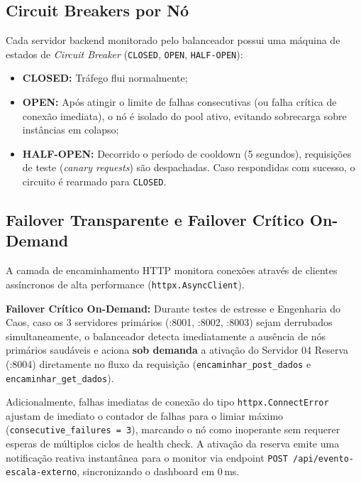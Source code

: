 \documentclass[12pt,a4paper]{article}
\begin{document}
\subsection{Circuit Breakers por Nó}
Cada servidor backend monitorado pelo balanceador possui uma máquina de estados de \textit{Circuit Breaker} (\texttt{CLOSED}, \texttt{OPEN}, \texttt{HALF-OPEN}):
\begin{itemize}
	\item \textbf{CLOSED:} Tráfego flui normalmente;
	\item \textbf{OPEN:} Após atingir o limite de falhas consecutivas (ou falha crítica de conexão imediata), o nó é isolado do pool ativo, evitando sobrecarga sobre instâncias em colapso;
	\item \textbf{HALF-OPEN:} Decorrido o período de cooldown (5 segundos), requisições de teste (\textit{canary requests}) são despachadas. Caso respondidas com sucesso, o circuito é rearmado para \texttt{CLOSED}.
\end{itemize}

\subsection{Failover Transparente e Failover Crítico On-Demand}
A camada de encaminhamento HTTP monitora conexões através de clientes assíncronos de alta performance (\texttt{httpx.AsyncClient}).

\textbf{Failover Crítico On-Demand:} Durante testes de estresse e Engenharia do Caos, caso os 3 servidores primários (:8001, :8002, :8003) sejam derrubados simultaneamente, o balanceador detecta imediatamente a ausência de nós primários saudáveis e aciona \textbf{sob demanda} a ativação do Servidor 04 Reserva (:8004) diretamente no fluxo da requisição (\texttt{encaminhar\_post\_dados} e \texttt{encaminhar\_get\_dados}).

Adicionalmente, falhas imediatas de conexão do tipo \texttt{httpx.ConnectError} ajustam de imediato o contador de falhas para o limiar máximo (\texttt{consecutive\_failures = 3}), marcando o nó como inoperante sem requerer esperas de múltiplos ciclos de health check. A ativação da reserva emite uma notificação reativa instantânea para o monitor via endpoint \texttt{POST /api/evento-escala-externo}, sincronizando o dashboard em 0\,ms.
\end{document}
